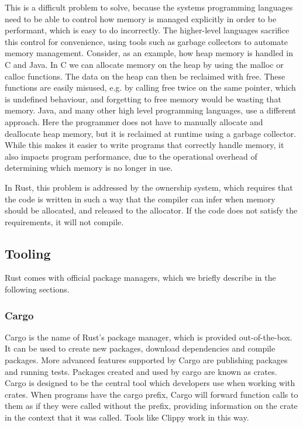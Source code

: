 \documentclass{article}
\begin{document}
This is a difficult problem to solve, because the systems programming languages need to be able to control how memory is managed explicitly in order to be performant, which is easy to do incorrectly. The higher-level languages sacrifice this control for convenience, using tools such as garbage collectors to automate memory management.
Consider, as an example, how heap memory is handled in C and Java. In C we can allocate memory on the heap by using the malloc or calloc functions. The data on the heap can then be reclaimed with free. These functions are easily misused, e.g. by calling free twice on the same pointer, which is undefined behaviour, and forgetting to free memory would be wasting that memory.
Java, and many other high level programming languages, use a different approach. Here the programmer does not have to manually allocate and deallocate heap memory, but it is reclaimed at runtime using a garbage collector. While this makes it easier to write programs that correctly handle memory, it also impacts program performance, due to the operational overhead of determining which memory is no longer in use.

In Rust, this problem is addressed by the ownership system, which requires that the code is written in such a way that the compiler can infer when memory should be allocated, and released to the allocator. If the code does not satisfy the requirements, it will not compile.

\subsection{Tooling}
Rust comes with official package managers, which we briefly describe in the following sections.

\subsubsection{Cargo}
Cargo is the name of Rust’s package manager, which is provided out-of-the-box. It can be used to create new packages, download dependencies and compile packages. More advanced features supported by Cargo are publishing packages and running tests. Packages created and used by cargo are known as crates. Cargo is designed to be the central tool which developers use when working with crates. When programs have the cargo prefix, Cargo will forward function calls to them as if they were called without the prefix, providing information on the crate in the context that it was called. Tools like Clippy work in this way.
\end{document}
